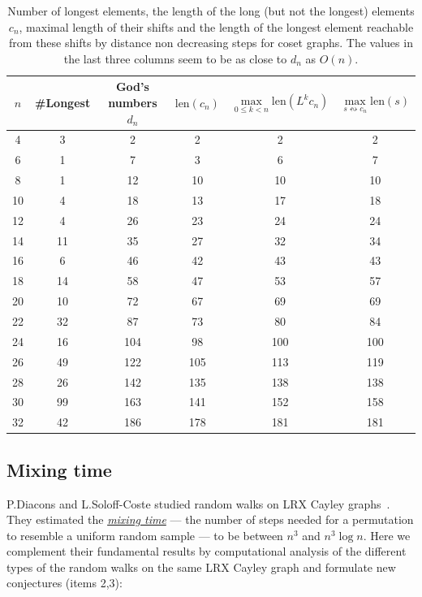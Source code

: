 \documentclass[reqno,11pt]{amsart}
\begin{document}
\begin{table}[ht!]
\centering
\begin{tabular}{|c|c|c|c|c|c|}
\hline
$n$ & \#Longest & God's numbers $d_n$ & $\mathrm{len}(c_n)$ & $\max\limits_{0\leq k < n}\mathrm{len}(L^kc_n)$ & $\max\limits_{s \leftrightsquigarrow c_n} \mathrm{len}(s)$ \\
\hline\hline
4  & 3  & 2  & 2 & 2 & 2 \\ \hline
6  & 1  & 7  & 3 & 6 & 7  \\ \hline
8  & 1  & 12 & 10 & 10 & 10 \\ \hline
10 & 4  & 18 & 13 & 17 & 18 \\ \hline
12 & 4  & 26 & 23 & 24 & 24 \\ \hline
14 & 11 & 35 & 27 & 32 & 34 \\ \hline
16 & 6  & 46 & 42 & 43 & 43 \\ \hline
18 & 14 & 58 & 47 & 53 & 57 \\ \hline
20 & 10 & 72 & 67 & 69 & 69 \\ \hline
22 & 32 & 87 & 73 & 80 & 84 \\ \hline
24 & 16 & 104 & 98 & 100 & 100 \\ \hline
26 & 49 & 122 & 105 & 113 & 119 \\ \hline
28 & 26 & 142 & 135 & 138 & 138 \\ \hline
30 & 99 & 163 & 141 & 152 & 158 \\ \hline
32 & 42 & 186 & 178 & 181 & 181 \\
\hline
\end{tabular}

\caption{Number of longest elements, the length of the long (but not the longest) elements $c_n$, maximal length of their shifts and the length of the longest element reachable from these shifts by distance non decreasing steps  for coset graphs. The values in the last three columns seem to be as close to $d_n$ as $O(n)$.}
\label{tab:coset_longest}
\end{table}

\clearpage
\subsection{Mixing time}\label{sec-mix}

P.Diacons and L.Soloff-Coste studied random walks on LRX Cayley graphs~\cite{diaconis1993comparison}. 
They estimated the \href{https://en.wikipedia.org/wiki/Markov_chain_mixing_time}{\textit{mixing time}} --- the number of steps needed for a permutation to resemble a uniform random sample --- to be between
$n^3$ and $n^3\log n$.
Here we complement their fundamental results by computational analysis of the different types of the random walks on the same LRX Cayley graph
and formulate new conjectures (items 2,3): 
\end{document}
